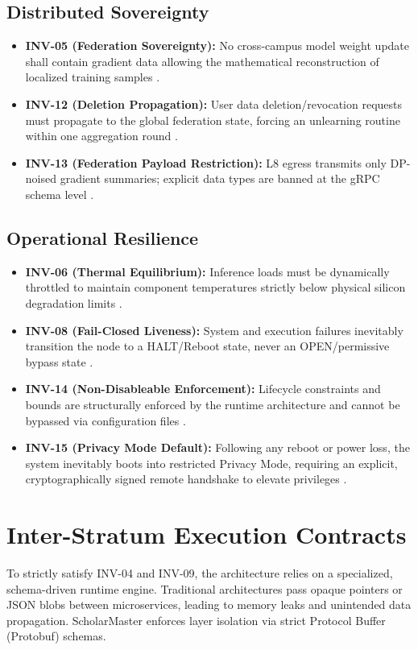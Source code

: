 \documentclass[conference]{IEEEtran}
\begin{document}
\subsection{Distributed Sovereignty}
\begin{itemize}
    \item \textbf{INV-05 (Federation Sovereignty):} No cross-campus model weight update shall contain gradient data allowing the mathematical reconstruction of localized training samples \cite{P14}.
    \item \textbf{INV-12 (Deletion Propagation):} User data deletion/revocation requests must propagate to the global federation state, forcing an unlearning routine within one aggregation round \cite{P14}.
    \item \textbf{INV-13 (Federation Payload Restriction):} L8 egress transmits only DP-noised gradient summaries; explicit data types are banned at the gRPC schema level \cite{P13}.
\end{itemize}

\subsection{Operational Resilience}
\begin{itemize}
    \item \textbf{INV-06 (Thermal Equilibrium):} Inference loads must be dynamically throttled to maintain component temperatures strictly below physical silicon degradation limits \cite{P5, P11}.
    \item \textbf{INV-08 (Fail-Closed Liveness):} System and execution failures inevitably transition the node to a HALT/Reboot state, never an OPEN/permissive bypass state \cite{P11, P18}.
    \item \textbf{INV-14 (Non-Disableable Enforcement):} Lifecycle constraints and bounds are structurally enforced by the runtime architecture and cannot be bypassed via configuration files \cite{P18}.
    \item \textbf{INV-15 (Privacy Mode Default):} Following any reboot or power loss, the system inevitably boots into restricted Privacy Mode, requiring an explicit, cryptographically signed remote handshake to elevate privileges \cite{P11}.
\end{itemize}

\section{Inter-Stratum Execution Contracts}
To strictly satisfy INV-04 and INV-09, the architecture relies on a specialized, schema-driven runtime engine. Traditional architectures pass opaque pointers or JSON blobs between microservices, leading to memory leaks and unintended data propagation. ScholarMaster enforces layer isolation via strict Protocol Buffer (Protobuf) schemas.
\end{document}

